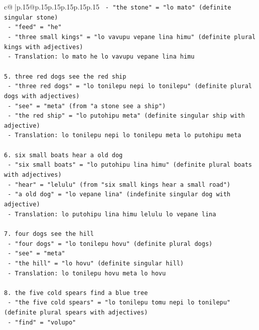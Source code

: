 \documentclass{article}
\begin{document}
{\begin{supertabular}{c@{$\;$}|p{.15\linewidth}@{}p{.15\linewidth}p{.15\linewidth}p{.15\linewidth}p{.15\linewidth}p{.15\linewidth}}
{{{\texttt{   {-} "the stone" = "lo mato" (definite singular stone)} \\
\texttt{   {-} "feed" = "he"} \\
\texttt{   {-} "three small kings" = "lo vavupu vepane lina himu" (definite plural kings with adjectives)} \\
\texttt{   {-} Translation: lo mato he lo vavupu vepane lina himu} \\
\\ 
\texttt{5. three red dogs see the red ship} \\
\texttt{   {-} "three red dogs" = "lo tonilepu nepi lo tonilepu" (definite plural dogs with adjectives)} \\
\texttt{   {-} "see" = "meta" (from "a stone see a ship")} \\
\texttt{   {-} "the red ship" = "lo putohipu meta" (definite singular ship with adjective)} \\
\texttt{   {-} Translation: lo tonilepu nepi lo tonilepu meta lo putohipu meta} \\
\\ 
\texttt{6. six small boats hear a old dog} \\
\texttt{   {-} "six small boats" = "lo putohipu lina himu" (definite plural boats with adjectives)} \\
\texttt{   {-} "hear" = "lelulu" (from "six small kings hear a small road")} \\
\texttt{   {-} "a old dog" = "lo vepane lina" (indefinite singular dog with adjective)} \\
\texttt{   {-} Translation: lo putohipu lina himu lelulu lo vepane lina} \\
\\ 
\texttt{7. four dogs see the hill} \\
\texttt{   {-} "four dogs" = "lo tonilepu hovu" (definite plural dogs)} \\
\texttt{   {-} "see" = "meta"} \\
\texttt{   {-} "the hill" = "lo hovu" (definite singular hill)} \\
\texttt{   {-} Translation: lo tonilepu hovu meta lo hovu} \\
\\ 
\texttt{8. the five cold spears find a blue tree} \\
\texttt{   {-} "the five cold spears" = "lo tonilepu tomu nepi lo tonilepu" (definite plural spears with adjectives)} \\
\texttt{   {-} "find" = "volupo"} \\
}}}
\end{supertabular}}
\end{document}
